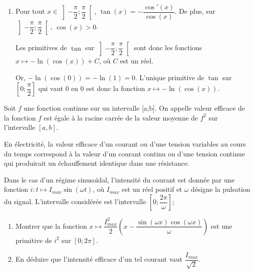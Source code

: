 \documentclass[11pt,fleqn, openany]{book} %
\begin{document}
\begin{solution}
\begin{enumerate}
\begin{center}
\begin{tikzpicture}[scale=1]
\end{tikzpicture}
\end{center}

\item Pour tout $x\in\left]-\dfrac{\pi}{2};\dfrac{\pi}{2}\right[$, $\tan(x)=-\dfrac{\cos'(x)}{\cos(x)}$. De plus, sur $\left]-\dfrac{\pi}{2};\dfrac{\pi}{2}\right[$, $\cos(x)>0$. 

Les primitives de $\tan$ sur $\left]-\dfrac{\pi}{2};\dfrac{\pi}{2}\right[$ sont donc les fonctions $x\mapsto -\ln(\cos(x)) +C$, où $C$ est un réel. 

Or, $-\ln(\cos(0))=-\ln(1)=0$. L'unique primitive de $\tan$ sur $\left[0;\dfrac{\pi}{2}\right]$ qui vaut 0 en 0 est donc la fonction $x\mapsto -\ln(\cos(x))$.
\end{enumerate}
\end{solution}




\begin{exercise}[topic=trig03, subtitle={(Tension efficace)}]
Soit $f$ une fonction continue sur un intervalle [a;b]. On appelle valeur efficace de la fonction $f$ est égale à la racine carrée de la valeur moyenne de $f^2$ sur l'intervalle $[a,b]$.

En électricité, la valeur efficace d'un courant ou d'une tension variables au cours du temps correspond à la valeur d'un courant continu ou d'une tension continue qui produirait un échauffement identique dans une résistance.

Dans le cas d'un régime sinusoïdal, l'intensité du courant est donnée par une fonction $i : t \mapsto I_{max}\sin(\omega t)$, où $I_{max}$ est un réel positif et $\omega$ désigne la pulsation du signal. L'intervalle considérée est l'intervalle $\left[0;\dfrac{2\pi}{\omega}\right]$;

\begin{enumerate}
\item Montrer que la fonction $x\mapsto \dfrac{I_{max}^2}{2}\left(x-\dfrac{\sin(\omega x)\cos(\omega x)}{\omega}\right)$ est une primitive de $i^2$ sur $[0;2\pi]$.
\item En déduire que l'intensité efficace d'un tel courant vaut $\dfrac{I_{max}}{\sqrt{2}}$.
\end{enumerate}\newpage \end{exercise}
\end{document}
